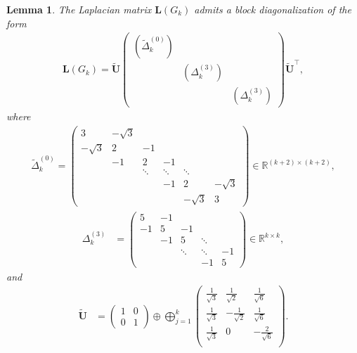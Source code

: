 \documentclass[11pt,a4paper]{amsart}
\newtheorem{lemma}[theorem]{Lemma}
\begin{document}
\begin{lemma}\label{lem:block-diag}
    The Laplacian matrix $\mathbf{L}(G_k)$ admits a block diagonalization of the form
        \begin{align}\label{eq:lap-block-repn}
            \mathbf{L}(G_k) = \widetilde{\mathbf{U}} \begin{pmatrix}
            (\widetilde{\Delta}_k^{(0)}) & & \\
            & (\Delta_k^{(3)}) & \\
            & & (\Delta_k^{(3)})
        \end{pmatrix} \widetilde{\mathbf{U}}^\top,
        \end{align}
    where
        \begin{align*}
            \widetilde{\Delta}_k^{(0)}=
            \begin{pmatrix}
            3 & -\sqrt3 &        &        &        &   \\
            -\sqrt3 & 2 & -1     &        &        &    \\
                    & -1 & 2 & -1&        &        \\
                    &    & \ddots & \ddots & \ddots &   \\
                    &    &        & -1 & 2 & -\sqrt3 \\
                   &    &        &    & -\sqrt3 & 3
            \end{pmatrix}\in\mathbb{R}^{(k+2)\times (k+2)}, 
        \end{align*}
        \begin{align*}
            \Delta_k^{(3)} &= \begin{pmatrix}
            5 & -1 &        &        & \\
            -1& 5  & -1     &        &  \\
               &-1 & 5      & \ddots &  \\
               &   & \ddots & \ddots & -1\\
              &   &        & -1 & 5
            \end{pmatrix}\in\mathbb{R}^{k\times k},
        \end{align*}
    and 
        \begin{align*}
            \widetilde{\mathbf{U}} &= \begin{pmatrix}
                1 & 0\\
                0 & 1
            \end{pmatrix} \oplus \bigoplus_{j=1}^{k} \begin{pmatrix}
                \tfrac{1}{\sqrt{3}} & \tfrac{1}{\sqrt{2}}&\tfrac{1}{\sqrt{6}}\\
                \tfrac{1}{\sqrt{3}} & -\tfrac{1}{\sqrt{2}}& \tfrac{1}{\sqrt{6}}\\
                \tfrac{1}{\sqrt{3}} & 0 & -\tfrac{2}{\sqrt{6}}\\
            \end{pmatrix}.
        \end{align*}
\end{lemma}
\end{document}
